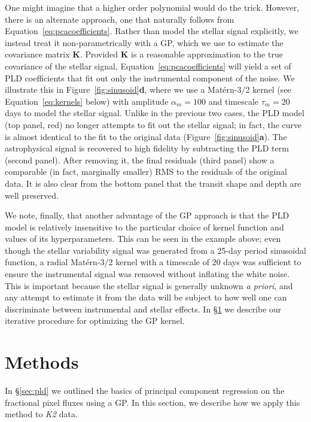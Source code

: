 \documentclass[]{emulateapj}
\begin{document}
One might imagine that a higher order polynomial would do the trick. However, there
is an alternate approach, one that naturally follows from Equation~\ref{eq:pcacoefficients}.
Rather than model the stellar signal explicitly, we instead treat it non-parametrically
with a GP, which we use to estimate the covariance matrix $\mathbf{K}$. Provided
$\mathbf{K}$ is a reasonable approximation to the true covariance of the stellar signal,
Equation~\ref{eq:pcacoefficients} will yield a set of PLD coefficients that 
fit out only the instrumental component of the noise. We illustrate this in 
Figure~\ref{fig:sinusoid}\textbf{d}, where we use a Mat\'ern-3/2 kernel 
(see Equation~\ref{eq:kernels} below) with amplitude $\alpha_m = 100$ and timescale
$\tau_m = 20$ days to model the stellar signal. Unlike in the previous two cases,
the PLD model (top panel, red) no longer attempts to fit out the stellar signal; in 
fact, the curve is almost identical to the fit to the original data 
(Figure~\ref{fig:sinusoid}\textbf{a}). The astrophysical signal is
recovered to high fidelity by subtracting the PLD term (second panel). After removing it,
the final residuals (third panel) show a comparable (in fact, marginally smaller) RMS to the
residuals of the original data. It is also clear from the bottom panel that the transit 
shape and depth are well preserved.

We note, finally, that another advantage of the GP approach is that the PLD model is
relatively insensitive to the particular choice of kernel function and values of its
hyperparameters. This can be seen in the example above; even though the stellar
variability signal was generated from a 25-day period sinusoidal function, a radial
Mat\'ern-3/2 kernel with a timescale of 20 days was sufficient to ensure the instrumental
signal was removed without inflating the white noise. This is important because the
stellar signal is generally unknown \emph{a priori}, and any attempt to estimate it from the data
will be subject to how well one can discriminate between instrumental and stellar effects.
In \S\ref{sec:methods} we describe our iterative procedure for optimizing the GP kernel.

\pagebreak

\section{Methods}
\label{sec:methods}
In \S\ref{sec:pld} we outlined the basics of principal component regression
on the fractional pixel fluxes using a GP. In this section, we describe how we apply
this method to \emph{K2} data.
\end{document}
